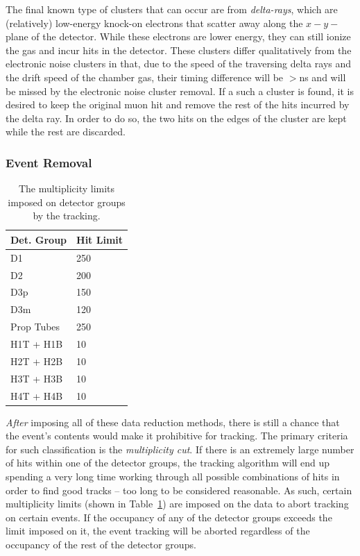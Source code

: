 The final known type of clusters that can occur are from \emph{delta-rays}, which are (relatively) low-energy knock-on electrons that scatter away along the $x-y-$plane of the detector. While these electrons are lower energy, they can still ionize the gas and incur hits in the detector. These clusters differ qualitatively from the electronic noise clusters in that, due to the speed of the traversing delta rays and the drift speed of the chamber gas, their timing difference will be $>$\unit[10]{ns} and will be missed by the electronic noise cluster removal. If a such a cluster is found, it is desired to keep the original muon hit and remove the rest of the hits incurred by the delta ray. In order to do so, the two hits on the edges of the cluster are kept while the rest are discarded.

\subsubsection{Event Removal}
\setlength{\columnsep}{28pt}
\begin{table}
	\centering
	\begin{tabular}{ll} \toprule  
		Det. Group & Hit Limit  \\ \midrule
		D1 & 250 \\  
		\rowcol D2 & 200 \\
		D3p & 150 \\
		\rowcol D3m & 120 \\
		Prop Tubes & 250 \\
		\rowcol H1T + H1B  & 10 \\
		H2T + H2B & 10 \\
		\rowcol H3T + H3B & 10 \\
		H4T + H4B & 10 \\ \bottomrule
	\end{tabular}
	\caption{The multiplicity limits imposed on detector groups by the tracking.}
	\label{tab:mult-limits}
\end{table}
\emph{After} imposing all of these data reduction methods, there is still a chance that the event's contents would make it prohibitive for tracking. The primary criteria for such classification is the \emph{multiplicity cut}. If there is an extremely large number of hits within one of the detector groups, the tracking algorithm will end up spending a very long time working through all possible combinations of hits in order to find good tracks -- too long to be considered reasonable. As such, certain multiplicity limits (shown in Table~\ref{tab:mult-limits}) are imposed on the data to abort tracking on certain events. If the occupancy of any of the detector groups exceeds the limit imposed on it, the event tracking will be aborted regardless of the occupancy of the rest of the detector groups. 

